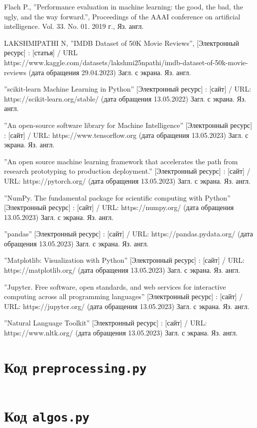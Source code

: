 \documentclass[bachelor, och, coursework]{SCWorks}
\begin{document}
\begin{thebibliography}{99}
     Flach P., ''Performance evaluation in machine learning: the
    good, the bad, the ugly, and the way forward.'', Proceedings of the AAAI
    conference on artificial intelligence. Vol. 33. No. 01. 2019 г., Яз. англ.


     LAKSHMIPATHI N, ''IMDB Dataset of 50K Movie Reviews'',
    [Электронный ресурс] : [статья] / URL
    https://www.kaggle.com/datasets/lakshmi25npathi/imdb-dataset-of-50k-movie-reviews
    (дата обращения 29.04.2023) Загл. с экрана. Яз. англ.


     ''scikit-learn Machine Learning in Python'' [Электронный
    ресурс] : [сайт] / URL: https://scikit-learn.org/stable/ (дата обращения
    13.05.2022) Загл. с экрана. Яз. англ.

     ''An open-source software library for Machine Intelligence''
    [Электронный ресурс] : [сайт] / URL: https://www.tensorflow.org (дата
    обращения 13.05.2023) Загл. с экрана. Яз. англ.

     ''An open source machine learning framework that
    accelerates the path from research prototyping to production deployment.''
    [Электронный ресурс] : [сайт] / URL: https://pytorch.org/ (дата обращения
    13.05.2023) Загл. с экрана. Яз. англ.

     ''NumPy. The fundamental package for scientific computing
    with Python'' [Электронный ресурс] : [сайт] / URL: https://numpy.org/ (дата
    обращения 13.05.2023) Загл. с экрана. Яз. англ.

     ''pandas'' [Электронный ресурс] : [сайт] / URL:
    https://pandas.pydata.org/ (дата обращения 13.05.2023) Загл. с экрана. Яз.
    англ.

     ''Matplotlib: Visualization with Python''
    [Электронный ресурс] : [сайт] / URL: https://matplotlib.org/ (дата обращения
    13.05.2023) Загл. с экрана. Яз. англ.

     ''Jupyter. Free software, open standards, and web
    services for interactive computing across all programming languages''
    [Электронный ресурс] : [сайт] / URL: https://jupyter.org/ (дата обращения
    13.05.2023) Загл. с экрана. Яз. англ.

     ''Natural Language Toolkit'' [Электронный ресурс] : [сайт]
    / URL: https://www.nltk.org/ (дата обращения 13.05.2023) Загл. с экрана. Яз.
    англ.

\end{thebibliography}

\appendix

    \section{Код \texttt{preprocessing.py}}
    \inputminted{py}{../movie-review-data/preprocessing.py}

    \section{Код \texttt{algos.py}}
    \inputminted{py}{../movie-review-data/algos.py}
\end{document}
